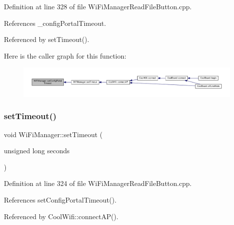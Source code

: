 Definition at line 328 of file Wi\+Fi\+Manager\+Read\+File\+Button.\+cpp.



References \+\_\+config\+Portal\+Timeout.



Referenced by set\+Timeout().

Here is the caller graph for this function\+:\nopagebreak
\begin{figure}[H]
\begin{center}
\leavevmode
\includegraphics[width=350pt]{d4/dc8/class_wi_fi_manager_a904006cb4d2c769e93bfdef336853766_icgraph}
\end{center}
\end{figure}
\mbox{\label{class_wi_fi_manager_aa6493d59c284ff245edb767ff684756d}} 
\subsubsection{\texorpdfstring{set\+Timeout()}{setTimeout()}}
{\footnotesize\ttfamily void Wi\+Fi\+Manager\+::set\+Timeout (\begin{DoxyParamCaption}\item[{unsigned long}]{seconds }\end{DoxyParamCaption})}



Definition at line 324 of file Wi\+Fi\+Manager\+Read\+File\+Button.\+cpp.



References set\+Config\+Portal\+Timeout().



Referenced by Cool\+Wifi\+::connect\+A\+P().

